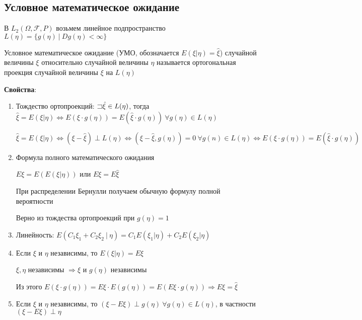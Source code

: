 \documentclass[12pt]{article}
\begin{document}
\subsection{Условное математическое ожидание}

В $L_2(\Omega, \mathcal{F}, P)$ возьмем линейное подпространство $L(\eta) = \{g(\eta) \ | \ Dg(\eta) < \infty\}$

 Условное математическое ожидание (УМО, обозначается $E(\xi|\eta) = \hat{\xi}$) случайной величины $\xi$
относительно случайной величины $\eta$ называется ортогональная проекция случайной величины $\xi$ на $L(\eta)$ 

\mediumvspace

\textbf{Свойства}:

\begin{enumerate}

    \item Тождество ортопроекций: $\mathord{\sqsupset} \hat{\xi} \in L(\eta)$, тогда $\hat{\xi} = E(\xi|\eta) \Longleftrightarrow E(\xi\cdot g(\eta)) = E(\hat{\xi}\cdot g(\eta)) \ \forall g(\eta) \in L(\eta)$

    \begin{MyProof}
        $\hat{\xi} = E(\xi|\eta) \Longleftrightarrow (\xi - \hat{\xi}) \perp L(\eta) \Longleftrightarrow 
        (\xi - \hat{\xi}, g(\eta)) = 0 \ \forall g(n) \in L(\eta) \Longleftrightarrow E(\xi\cdot g(\eta)) = E(\hat{\xi}\cdot g(\eta))$
    \end{MyProof}

    \item Формула полного математического ожидания

    $E\xi = E(E(\xi|\eta))$ или $E\xi = E\hat{\xi}$

    \Nota При распределении Бернулли получаем обычную формулу полной вероятности

    \begin{MyProof}
        Верно из тождества ортопроекций при $g(\eta) = 1$
    \end{MyProof}

    \item Линейность: $E(C_1\xi_1 + C_2\xi_2 \ | \ \eta) = C_1 E(\xi_1|\eta) + C_2 E(\xi_2|\eta)$

    \item Если $\xi$ и $\eta$ независимы, то $E(\xi|\eta) = E\xi$

    \begin{MyProof}
        $\xi, \eta$ независимы $\Longrightarrow \xi$ и $g(\eta)$ независимы

        Из этого $E(\xi \cdot g(\eta)) = E\xi \cdot E(g(\eta)) = E(E\xi \cdot g(\eta)) \Longrightarrow E\xi = \hat{\xi}$
    \end{MyProof}

    \item Если $\xi$ и $\eta$ независимы, то $(\xi - E\xi) \perp g(\eta) \ \forall g(\eta) \in L(\eta)$, 
в частности $(\xi - E\xi) \perp \eta$

\end{enumerate}
\end{document}
